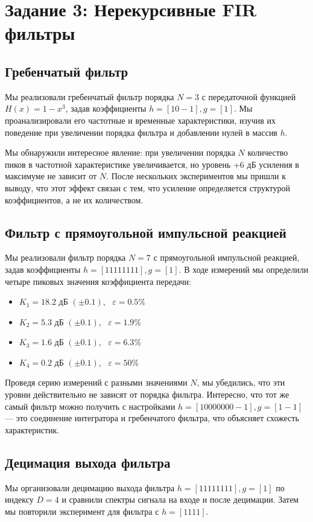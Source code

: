 \section{Задание 3: Нерекурсивные FIR фильтры}

\subsection{Гребенчатый фильтр}
Мы реализовали гребенчатый фильтр порядка $N = 3$ с передаточной функцией $H(x) = 1 - x^3$, задав коэффициенты $h = [1 0 -1], g = [1]$. Мы проанализировали его частотные и временные характеристики, изучив их поведение при увеличении порядка фильтра и добавлении нулей в массив $h$. 

Мы обнаружили интересное явление: при увеличении порядка $N$ количество пиков в частотной характеристике увеличивается, но уровень +6 дБ усиления в максимуме не зависит от $N$. После нескольких экспериментов мы пришли к выводу, что этот эффект связан с тем, что усиление определяется структурой коэффициентов, а не их количеством.

\subsection{Фильтр с прямоугольной импульсной реакцией}
Мы реализовали фильтр порядка $N = 7$ с прямоугольной импульсной реакцией, задав коэффициенты $h = [1 1 1 1 1 1 1 1], g = [1]$. В ходе измерений мы определили четыре пиковых значения коэффициента передачи:
\begin{itemize}
    \item $K_1 = 18.2$ дБ $\left( \pm 0.1 \right)$, \ $\varepsilon = 0.5\%$
    \item $K_2 = 5.3$ дБ $\left( \pm 0.1 \right)$, \ $\varepsilon = 1.9\%$
    \item $K_3 = 1.6$ дБ $\left( \pm 0.1 \right)$, \ $\varepsilon = 6.3\%$
    \item $K_4 = 0.2$ дБ $\left( \pm 0.1 \right)$, \ $\varepsilon = 50\%$
\end{itemize}

Проведя серию измерений с разными значениями $N$, мы убедились, что эти уровни действительно не зависят от порядка фильтра. Интересно, что тот же самый фильтр можно получить с настройками $h = [1 0 0 0 0 0 0 0 -1], g = [1 -1]$ — это соединение интегратора и гребенчатого фильтра, что объясняет схожесть характеристик.

\subsection{Децимация выхода фильтра}
Мы организовали децимацию выхода фильтра $h = [1 1 1 1 1 1 1 1], g = [1]$ по индексу $D = 4$ и сравнили спектры сигнала на входе и после децимации. Затем мы повторили эксперимент для фильтра с $h = [1 1 1 1]$. 

